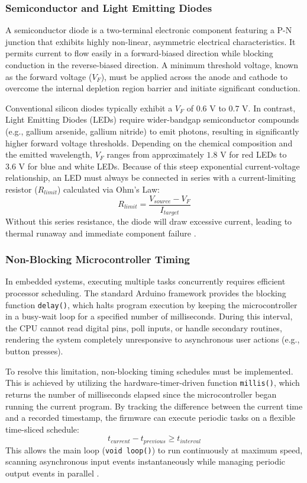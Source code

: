 \subsubsection{Semiconductor and Light Emitting Diodes}
A semiconductor diode is a two-terminal electronic component featuring a P-N junction that exhibits highly non-linear, asymmetric electrical characteristics. It permits current to flow easily in a forward-biased direction while blocking conduction in the reverse-biased direction. A minimum threshold voltage, known as the forward voltage ($V_F$), must be applied across the anode and cathode to overcome the internal depletion region barrier and initiate significant conduction. 

Conventional silicon diodes typically exhibit a $V_F$ of $0.6\text{ V}$ to $0.7\text{ V}$. In contrast, Light Emitting Diodes (LEDs) require wider-bandgap semiconductor compounds (e.g., gallium arsenide, gallium nitride) to emit photons, resulting in significantly higher forward voltage thresholds. Depending on the chemical composition and the emitted wavelength, $V_F$ ranges from approximately $1.8\text{ V}$ for red LEDs to $3.6\text{ V}$ for blue and white LEDs. Because of this steep exponential current-voltage relationship, an LED must always be connected in series with a current-limiting resistor ($R_{limit}$) calculated via Ohm's Law:
\begin{equation}
    R_{limit} = \frac{V_{source} - V_F}{I_{target}}
\end{equation}
Without this series resistance, the diode will draw excessive current, leading to thermal runaway and immediate component failure \cite{ridgway2024}.

\subsubsection{Non-Blocking Microcontroller Timing}
In embedded systems, executing multiple tasks concurrently requires efficient processor scheduling. The standard Arduino framework provides the blocking function \texttt{delay()}, which halts program execution by keeping the microcontroller in a busy-wait loop for a specified number of milliseconds. During this interval, the CPU cannot read digital pins, poll inputs, or handle secondary routines, rendering the system completely unresponsive to asynchronous user actions (e.g., button presses).

To resolve this limitation, non-blocking timing schedules must be implemented. This is achieved by utilizing the hardware-timer-driven function \texttt{millis()}, which returns the number of milliseconds elapsed since the microcontroller began running the current program. By tracking the difference between the current time and a recorded timestamp, the firmware can execute periodic tasks on a flexible time-sliced schedule:
\begin{equation}
    t_{current} - t_{previous} \ge t_{interval}
\end{equation}
This allows the main loop (\texttt{void loop()}) to run continuously at maximum speed, scanning asynchronous input events instantaneously while managing periodic output events in parallel \cite{dahlen2023}.

